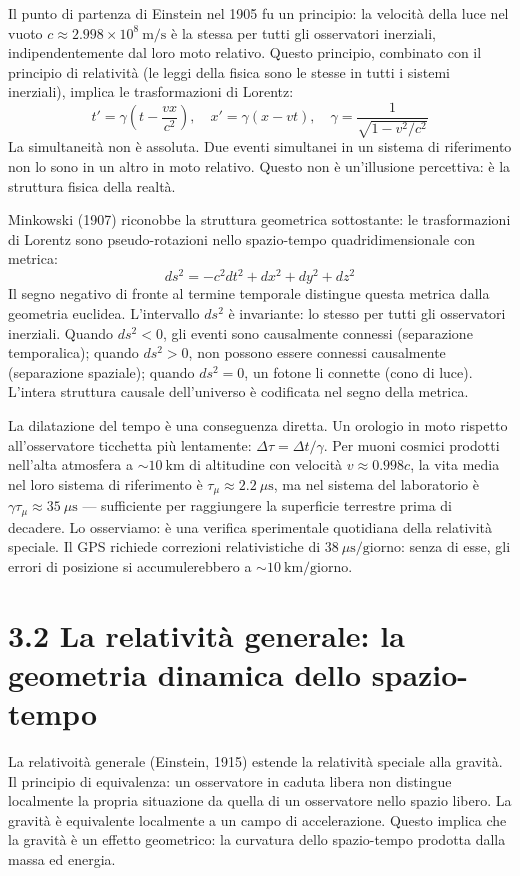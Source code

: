\documentclass[11.5pt,a4paper,openany]{book}
\theoremstyle{remark}
\begin{document}
Il punto di partenza di Einstein nel 1905 fu un principio: la velocità della luce nel vuoto $c \approx 2.998 \times 10^8\ \text{m/s}$ è la stessa per tutti gli osservatori inerziali, indipendentemente dal loro moto relativo. Questo principio, combinato con il principio di relatività (le leggi della fisica sono le stesse in tutti i sistemi inerziali), implica le trasformazioni di Lorentz:
\[
t' = \gamma\left(t - \frac{vx}{c^2}\right), \quad x' = \gamma(x - vt), \quad \gamma = \frac{1}{\sqrt{1-v^2/c^2}}
\]
La simultaneità non è assoluta. Due eventi simultanei in un sistema di riferimento non lo sono in un altro in moto relativo. Questo non è un'illusione percettiva: è la struttura fisica della realtà.

Minkowski (1907) riconobbe la struttura geometrica sottostante: le trasformazioni di Lorentz sono pseudo-rotazioni nello spazio-tempo quadridimensionale con metrica:
\[
ds^2 = -c^2 dt^2 + dx^2 + dy^2 + dz^2
\]
Il segno negativo di fronte al termine temporale distingue questa metrica dalla geometria euclidea. L'intervallo $ds^2$ è invariante: lo stesso per tutti gli osservatori inerziali. Quando $ds^2 < 0$, gli eventi sono causalmente connessi (separazione temporalica); quando $ds^2 > 0$, non possono essere connessi causalmente (separazione spaziale); quando $ds^2 = 0$, un fotone li connette (cono di luce). L'intera struttura causale dell'universo è codificata nel segno della metrica.

La dilatazione del tempo è una conseguenza diretta. Un orologio in moto rispetto all'osservatore ticchetta più lentamente: $\Delta\tau = \Delta t/\gamma$. Per muoni cosmici prodotti nell'alta atmosfera a $\sim 10\ \text{km}$ di altitudine con velocità $v \approx 0.998c$, la vita media nel loro sistema di riferimento è $\tau_\mu \approx 2.2\ \mu\text{s}$, ma nel sistema del laboratorio è $\gamma\tau_\mu \approx 35\ \mu\text{s}$ --- sufficiente per raggiungere la superficie terrestre prima di decadere. Lo osserviamo: è una verifica sperimentale quotidiana della relatività speciale. Il GPS richiede correzioni relativistiche di $38\ \mu\text{s}/\text{giorno}$: senza di esse, gli errori di posizione si accumulerebbero a $\sim 10\ \text{km}/\text{giorno}$.

\section{3.2 La relatività generale: la geometria dinamica dello spazio-tempo}

La relativoità generale (Einstein, 1915) estende la relatività speciale alla gravità. Il principio di equivalenza: un osservatore in caduta libera non distingue localmente la propria situazione da quella di un osservatore nello spazio libero. La gravità è equivalente localmente a un campo di accelerazione. Questo implica che la gravità è un effetto geometrico: la curvatura dello spazio-tempo prodotta dalla massa ed energia.
\end{document}
